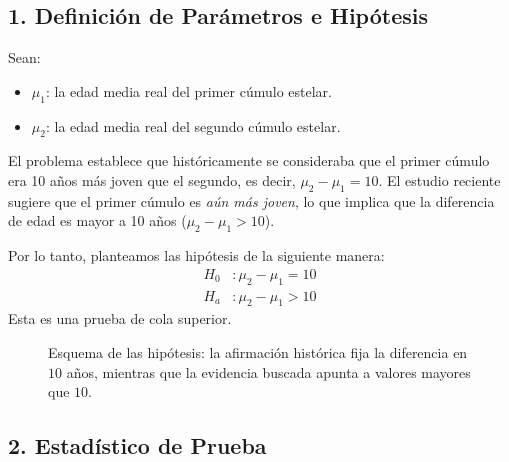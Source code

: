\documentclass[12pt]{article}
\begin{document}
\subsection*{1. Definición de Parámetros e Hipótesis}

Sean:
\begin{itemize}
    \item $\mu_1$: la edad media real del primer cúmulo estelar.
    \item $\mu_2$: la edad media real del segundo cúmulo estelar.
\end{itemize}

El problema establece que históricamente se consideraba que el primer cúmulo era 10 años más joven que el segundo, es decir, $\mu_2 - \mu_1 = 10$. El estudio reciente sugiere que el primer cúmulo es \textit{aún más joven}, lo que implica que la diferencia de edad es mayor a 10 años ($\mu_2 - \mu_1 > 10$).

Por lo tanto, planteamos las hipótesis de la siguiente manera:
\begin{align*}
    H_0 &: \mu_2 - \mu_1 = 10 \\
    H_a &: \mu_2 - \mu_1 > 10
\end{align*}
Esta es una prueba de cola superior.

\begin{figure}[H]
\centering
{}
\caption{Esquema de las hipótesis: la afirmación histórica fija la diferencia en $10$ años, mientras que la evidencia buscada apunta a valores mayores que $10$.}
\end{figure}

\subsection*{2. Estadístico de Prueba}
\end{document}
